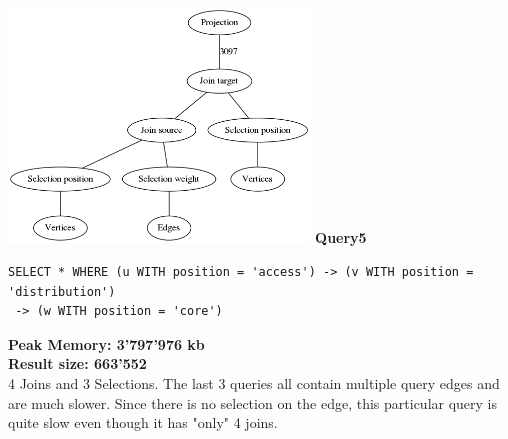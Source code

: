 \documentclass[11pt,singlecolumn]{scrartcl}
\begin{document}
\includegraphics[width=0.6\textwidth]{graph4}\clearpage
\textbf{Query5}\\
\begin{verbatim}
SELECT * WHERE (u WITH position = 'access') -> (v WITH position = 'distribution')
 -> (w WITH position = 'core')\end{verbatim}
\textbf{Peak Memory: 3'797'976 kb}\\
\textbf{Result size: 663'552}\\
4 Joins and 3 Selections. The last 3 queries all contain multiple query edges and are much slower. Since there is no selection on the edge, this particular query is quite slow even though it has "only" 4 joins.
\clearpage
\end{document}
